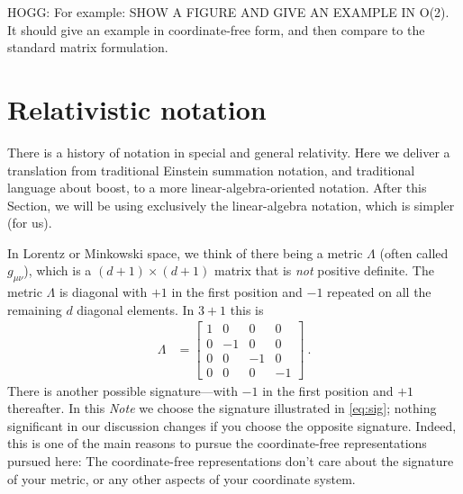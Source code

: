 \documentclass{article}
\newcommand{\documentname}{\textsl{Note}}
\begin{document}
HOGG: For example: SHOW A FIGURE AND GIVE AN EXAMPLE IN O(2).
It should give an example in coordinate-free form, and then compare
to the standard matrix formulation.

\section{Relativistic notation}\label{sec:notation}

There is a history of notation in special and general relativity.
Here we deliver a translation from traditional Einstein summation notation, and traditional language about boost, to a more linear-algebra-oriented notation.
After this Section, we will be using exclusively the linear-algebra notation, which is simpler (for us).

In Lorentz or Minkowski space, we think of there being a metric $\Lambda$ (often called $g_{\mu\nu}$), which is a $(d+1)\times(d+1)$ matrix that is \emph{not} positive definite.
The metric $\Lambda$ is diagonal with $+1$ in the first position and $-1$ repeated on all the remaining $d$ diagonal elements.
In $3+1$ this is
\begin{align}\label{eq:sig}
    \Lambda &= \begin{bmatrix}1 & 0 & 0 & 0\\
                              0 & -1 & 0 & 0\\
                              0 & 0 & -1 & 0\\
                              0 & 0 & 0 & -1\end{bmatrix} ~.
\end{align}
There is another possible signature---with $-1$ in the first position and $+1$ thereafter.
In this \documentname{} we choose the signature illustrated in \eqref{eq:sig}; nothing significant in our discussion changes if you choose the opposite signature.
Indeed, this is one of the main reasons to pursue the coordinate-free representations pursued here:
The coordinate-free representations don't care about the signature of your metric, or any other aspects of your coordinate system.
\end{document}

